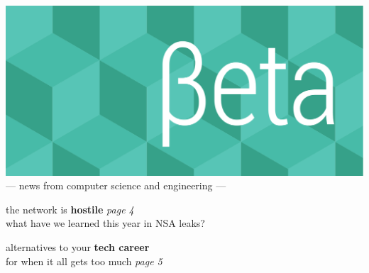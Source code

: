\documentclass[twoside]{article}
\date{2 September 2015}
\begin{document}
\thispagestyle{empty}
\begingroup%
\vspace*{-3.5cm}\centering\hspace*{-2.8cm}%
\includegraphics[trim=0mm 20mm 0mm 0mm, clip, width=22cm]{../../style/beta-logo.pdf}%
\vspace{1em}
{\sffamily\fontsize{32pt}{32pt}\selectfont --- news from computer science and engineering ---}
\endgroup\vspace*{3ex}

\center
\vfill
{\sffamily\fontsize{56pt}{72pt}\selectfont the network is {\bfseries hostile}}%
\hfill{\rmfamily\fontsize{14pt}{14pt}\selectfont\it page 4}\\
{\rmfamily\fontsize{16pt}{16pt} what have we learned this year in NSA leaks?\hfill ~}

\vspace*{6em}
{\sffamily\fontsize{50pt}{72pt}\selectfont alternatives to your {\bfseries tech career}\hfill ~}\\
{\rmfamily\fontsize{16pt}{16pt} for when it all gets too much\hfill%
  \rmfamily\fontsize{14pt}{14pt}\selectfont\it page 5}%
\vfill

\endcenter
\end{document}
